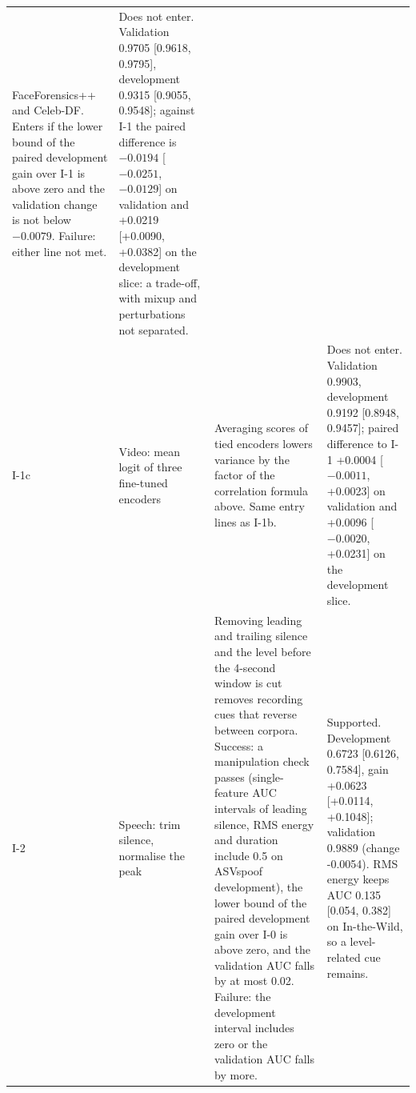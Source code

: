 \documentclass[conference,a4paper]{IEEEtran_nodash}
\begin{document}
\begin{table}[!t]
\begin{tabular}{@{}l L{2.4cm} L{7.1cm} L{3.8cm}@{}}
FaceForensics++ and Celeb-DF. Enters if the lower bound of the paired development
gain over I-1 is above zero and the validation change is not below $-0.0079$.
Failure: either line not met. &
Does not enter. Validation 0.9705 [0.9618, 0.9795], development 0.9315 [0.9055,
0.9548]; against I-1 the paired difference is $-0.0194$ [$-0.0251$, $-0.0129$] on
validation and +0.0219 [+0.0090, +0.0382] on the development slice: a trade-off,
with mixup and perturbations not separated. %
\\
\addlinespace[3pt]
I-1c & Video: mean logit of three fine-tuned encoders &
Averaging scores of tied encoders lowers variance by the factor of the
correlation formula above. Same entry lines as I-1b. &
Does not enter. Validation 0.9903, development 0.9192 [0.8948, 0.9457]; paired
difference to I-1 +0.0004 [$-0.0011$, +0.0023] on validation and +0.0096
[$-0.0020$, +0.0231] on the development slice. %
\\
\addlinespace[3pt]
I-2 & Speech: trim silence, normalise the peak &
Removing leading and trailing silence and the level before the 4-second window
is cut removes recording cues that reverse between corpora. Success: a
manipulation check passes (single-feature AUC intervals of leading silence,
RMS energy and duration include 0.5 on ASVspoof development), the lower bound of
the paired development gain over I-0 is above zero, and the validation AUC falls
by at most 0.02. Failure: the development interval includes zero or the
validation AUC falls by more. &
Supported. Development 0.6723 [0.6126, 0.7584], gain +0.0623 [+0.0114,
+0.1048]; validation 0.9889 (change -0.0054). RMS energy keeps AUC 0.135 [0.054,
0.382] on In-the-Wild, so a level-related cue remains. %
\\
\bottomrule
\end{tabular}
\end{table}
\end{document}
